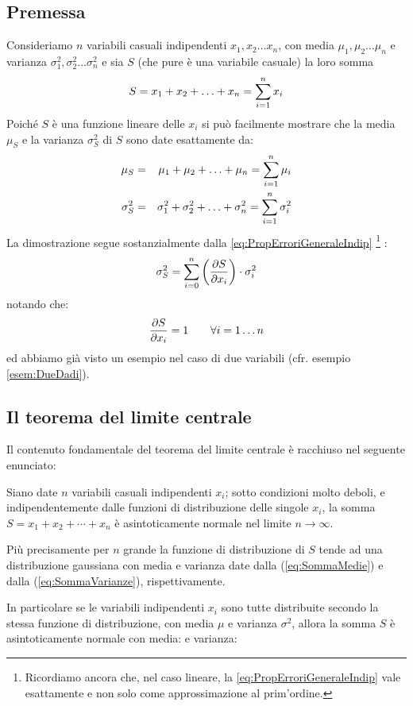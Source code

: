 \subsection{Premessa}
Consideriamo $n$ variabili casuali indipendenti $x_1, x_2 \ldots x_n$,
con media $\mu_1, \mu_2 \ldots \mu_n$ e varianza
$\sigma^2_1, \sigma^2_2 \ldots \sigma^2_n$ e sia $S$ (che pure \`e una
variabile casuale) la loro somma
$$
S = x_1 + x_2 + \ldots + x_n = \dsum{x_i}{i}{1}{n}
$$
Poich\'e $S$ \`e una funzione lineare delle $x_i$ si pu\`o
facilmente mostrare che la media $\mu_S$ e la varianza $\sigma^2_S$
di $S$ sono date esattamente da:
\begin{eqnarray}
\mu_S &=& \mu_1 + \mu_2 + \ldots + \mu_n =
\dsum{\mu_i}{i}{1}{n}\label{eq:SommaMedie}\\
\sigma^2_S &=& \sigma_1^2 + \sigma_2^2 + \ldots + \sigma_n^2 =
\dsum{\sigma^2_i}{i}{1}{n}
\label{eq:SommaVarianze}
\end{eqnarray}
La dimostrazione segue sostanzialmente dalla \ref{eq:PropErroriGeneraleIndip}%
\renewcommand{\thefootnote}{\fnsymbol{footnote}}
\footnote{
Ricordiamo ancora che, nel caso lineare, la \ref{eq:PropErroriGeneraleIndip}
vale esattamente e non solo come approssimazione al prim'ordine.
}\renewcommand{\thefootnote}{\arabic{footnote}}%
:
$$
\sigma^2_S = \sum_{i=0}^{n} \left( \pfder{S}{x_i} \right) \cdot \sigma^2_i
$$
notando che:
$$
\pfder{S}{x_i} = 1 \qquad \forall i = 1\ldots n
$$
ed abbiamo gi\`a visto un esempio nel caso di due variabili
(cfr. esempio \ref{esem:DueDadi}).


\subsection{Il teorema del limite centrale}

Il contenuto fondamentale del teorema del limite centrale \cite{Cramer}
\`e racchiuso nel seguente enunciato:
\begin{teo}
Siano date $n$ variabili casuali indipendenti $x_i$; sotto
condizioni molto deboli, e indipendentemente dalle funzioni di
distribuzione delle singole $x_i$, la somma
$S = x_1 + x_2 +\cdots+x_n$ \`e asintoticamente
normale nel limite $n \rightarrow \infty$.
\end{teo}
Pi\`u precisamente per $n$ grande la funzione di distribuzione di $S$
tende ad una distribuzione gaussiana con media e varianza date
dalla (\ref{eq:SommaMedie}) e dalla (\ref{eq:SommaVarianze}),
rispettivamente.

In particolare se le variabili indipendenti $x_i$ sono tutte
distribuite secondo la stessa funzione di distribuzione, con media
$\mu$ e varianza $\sigma^2$, allora la somma $S$ \`e asintoticamente
normale con media:
e varianza:

